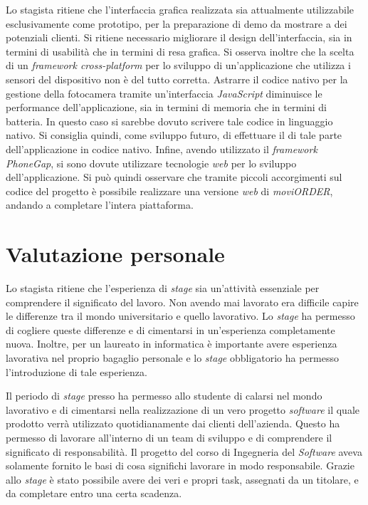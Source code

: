 Lo stagista ritiene che l'interfaccia grafica realizzata sia attualmente utilizzabile esclusivamente come prototipo, per la preparazione di demo da mostrare a dei potenziali clienti. Si ritiene necessario migliorare il design dell'interfaccia, sia in termini di usabilità che in termini di resa grafica. 
Si osserva inoltre che la scelta di un \textit{framework cross-platform} per lo sviluppo di un'applicazione che utilizza i sensori del dispositivo non è del tutto corretta. Astrarre il codice nativo per la gestione della fotocamera tramite un'interfaccia \textit{JavaScript} diminuisce le performance dell'applicazione, sia in termini di memoria che in termini di batteria. In questo caso si sarebbe dovuto scrivere tale codice in linguaggio nativo. Si consiglia quindi, come sviluppo futuro, di effettuare il  di tale parte dell'applicazione in codice nativo.
Infine, avendo utilizzato il \textit{framework PhoneGap}, si sono dovute utilizzare tecnologie \textit{web} per lo sviluppo dell'applicazione. Si può quindi osservare che tramite piccoli accorgimenti sul codice del progetto è possibile realizzare una versione \textit{web} di \textit{moviORDER}, andando a completare l'intera piattaforma.

\section{Valutazione personale}

Lo stagista ritiene che l'esperienza di \textit{stage} sia un'attività essenziale per comprendere il significato del lavoro. Non avendo mai lavorato era difficile capire le differenze tra il mondo universitario e quello lavorativo. Lo \textit{stage} ha permesso di cogliere queste differenze e di cimentarsi in un'esperienza completamente nuova. Inoltre, per un laureato in informatica è importante avere esperienza lavorativa nel proprio bagaglio personale e lo \textit{stage} obbligatorio ha permesso l'introduzione di tale esperienza.

Il periodo di \textit{stage} presso \visione{} ha permesso allo studente di calarsi nel mondo lavorativo e di cimentarsi nella realizzazione di un vero progetto \textit{software} il quale prodotto verrà utilizzato quotidianamente dai clienti dell'azienda. Questo ha permesso di lavorare all'interno di un team di sviluppo e di comprendere il significato di responsabilità. Il progetto del corso di Ingegneria del \textit{Software} aveva solamente fornito le basi di cosa significhi lavorare in modo responsabile. Grazie allo \textit{stage} è stato possibile avere dei veri e propri task, assegnati da un titolare, e da completare entro una certa scadenza.

